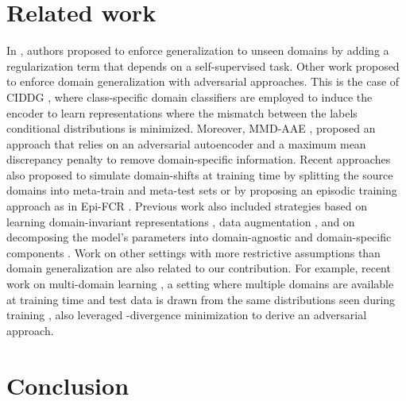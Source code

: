 \documentclass{article}
\begin{document}
\section{Related work}\label{sec:rel_work}
In \cite{carlucci2019domain}, authors proposed to enforce generalization to unseen domains by adding a regularization term that depends on a self-supervised task. Other work proposed to enforce domain generalization with adversarial approaches. This is the case of CIDDG \cite{li2018deep}, where class-specific domain classifiers are employed to induce the encoder to learn representations where the mismatch between the labels conditional distributions is minimized. Moreover, MMD-AAE \cite{li2018domain}, proposed an approach that relies on an adversarial autoencoder and a maximum mean discrepancy penalty to remove domain-specific information. Recent approaches also proposed to simulate domain-shifts at training time by splitting the source domains into meta-train and meta-test sets \cite{li2018learning,balaji2018metareg,dou2019domain} or by proposing an episodic training approach as in Epi-FCR \cite{li2019episodic}. Previous work also included strategies based on learning domain-invariant representations \cite{muandet2013domain,arjovsky2019invariant}, data augmentation \cite{volpi2018generalizing,shankar2018generalizing}, and on decomposing the model's parameters into domain-agnostic and domain-specific components \cite{li2017deeper}.
Work on other settings with more restrictive assumptions than domain generalization are also related to our contribution. For example, recent work on multi-domain learning \cite{schoenauer2019multi}, a setting where multiple domains are available at training time and test data is drawn from the same distributions seen during training \cite{dredze2010multi}, also leveraged -divergence minimization to derive an adversarial approach.



\section{Conclusion}\label{sec:conc}
\end{document}
